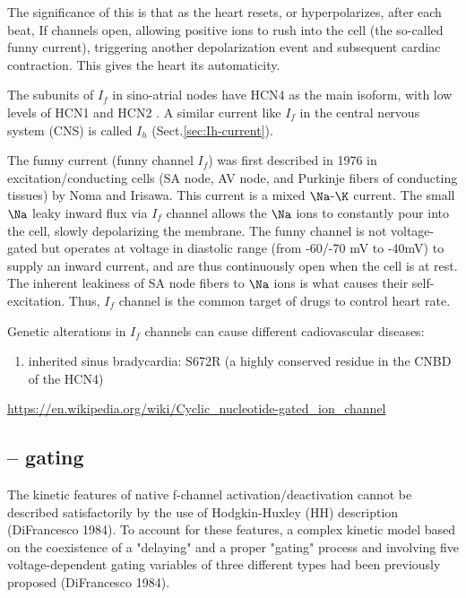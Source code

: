 The significance of this is that as the heart resets, or hyperpolarizes, after
each beat, If channels open, allowing positive ions to rush into the cell (the
so-called funny current), triggering another depolarization event and subsequent
cardiac contraction. This gives the heart its automaticity.

The subunits of $I_f$ in sino-atrial nodes have HCN4 as the main isoform, with
low levels of HCN1 and HCN2 \citep{Herrmann2011, Baruscotti2010, Brioschi2009}.
A similar current like $I_f$ in the central nervous system (CNS) is
called $I_h$ (Sect.\ref{sec:Ih-current}). 
  

\begin{mdframed}

The funny current (funny channel $I_f$) was first described in 1976 
in excitation/conducting cells (SA node, AV node, and Purkinje fibers of
conducting tissues) by Noma and Irisawa. This current is a mixed $\Na$-$\K$
current. The small $\Na$ leaky inward flux via $I_f$ channel allows the $\Na$ ions to constantly pour
into the cell, slowly depolarizing the membrane. The funny channel is not
voltage-gated but operates at voltage in diastolic range (from -60/-70 mV to
-40mV) to supply an inward current, and are thus continuously open when the
cell is at rest. The inherent leakiness of SA node fibers to $\Na$ ions is what
causes their self-excitation. Thus, $I_f$ channel is the common target of
drugs to control heart rate.

\end{mdframed}


Genetic alterations in $I_f$ channels can cause different cadiovascular
diseases: 
\begin{enumerate}
  \item inherited sinus bradycardia: S672R (a highly conserved residue in the
  CNBD of the HCN4)
\end{enumerate}


\url{https://en.wikipedia.org/wiki/Cyclic_nucleotide-gated_ion_channel}


\subsection{-- gating}

The kinetic features of native f-channel activation/deactivation cannot be
described satisfactorily by the use of Hodgkin-Huxley (HH) description
(DiFrancesco 1984).  To account for these features, a complex kinetic model
based on the coexistence of a "delaying" and a proper "gating" process and
involving five voltage-dependent gating variables of three different types had
been previously proposed (DiFrancesco 1984). 

